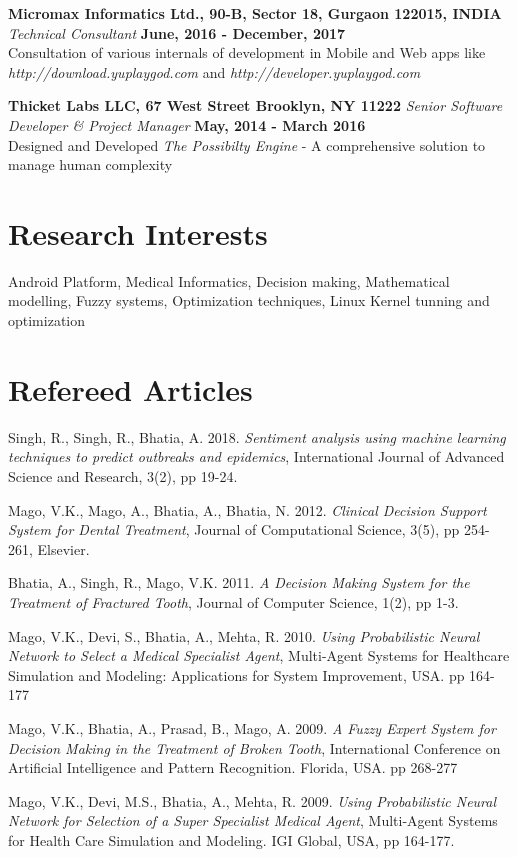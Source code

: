 \documentclass[margin,line]{res}
\begin{document}
\begin{resume}
{\bf Micromax Informatics Ltd., 90-B, Sector 18, Gurgaon 122015, INDIA}
{\em Technical Consultant} \hfill {\bf June, 2016 - December, 2017}\\
Consultation of various internals of development in Mobile and Web apps like {\em http://download.yuplaygod.com} and {\em http://developer.yuplaygod.com}

{\bf Thicket Labs LLC, 67 West Street Brooklyn, NY 11222}
{\em Senior Software Developer \& Project Manager} \hfill {\bf May, 2014 - March 2016}\\
Designed and Developed {\em The Possibilty Engine} - A comprehensive solution to manage human complexity

\section{\sc Research Interests}
Android Platform, Medical Informatics, Decision making, Mathematical modelling, Fuzzy systems, Optimization techniques, Linux Kernel tunning and optimization

\section{\sc Refereed Articles}
Singh, R., Singh, R., Bhatia, A. 2018. \emph{Sentiment analysis using machine learning techniques to predict outbreaks and epidemics}, International Journal of Advanced Science and Research, 3(2), pp 19-24.

Mago, V.K., Mago, A., Bhatia, A., Bhatia, N. 2012. \emph{Clinical Decision Support System for Dental Treatment},  Journal of Computational Science, 3(5), pp 254-261, Elsevier.

Bhatia, A., Singh, R., Mago, V.K. 2011. \emph{A Decision Making System for the Treatment of Fractured Tooth}, Journal of Computer Science, 1(2), pp 1-3.

Mago, V.K., Devi, S., Bhatia, A., Mehta, R. 2010. \emph{Using Probabilistic Neural Network to Select a Medical Specialist Agent}, Multi-Agent Systems for Healthcare Simulation and Modeling: Applications for System Improvement, USA. pp 164-177

Mago, V.K., Bhatia, A., Prasad,  B., Mago, A. 2009. \emph{A Fuzzy Expert System for Decision Making in the Treatment of Broken Tooth}, International Conference on Artificial Intelligence and Pattern Recognition. Florida, USA. pp 268-277

Mago, V.K., Devi, M.S., Bhatia, A., Mehta, R. 2009. \emph{Using Probabilistic Neural Network for Selection of a Super Specialist Medical Agent}, Multi-Agent Systems for Health Care Simulation and Modeling. IGI Global, USA, pp 164-177.


\end{resume}
\end{document}
